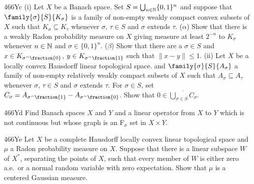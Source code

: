{\spheader 466Yc
(i) Let $X$ be a Banach space.   Set $S=\bigcup_{n\in\Bbb N}\{0,1\}^n$ and
suppose that $\family{\sigma}{S}{K_{\sigma}}$ is a family of
non-empty weakly compact
convex subsets of $X$ such that $K_{\sigma}\subseteq K_{\tau}$ whenever
$\sigma$, $\tau\in S$ and $\sigma$ extends $\tau$.   ($\alpha$) Show that
there is a weakly Radon
probability measure on $X$ giving measure at least $2^{-n}$ to $K_{\sigma}$
whenever $n\in\Bbb N$ and $\sigma\in\{0,1\}^n$.   ($\beta$) Show that
there are a $\sigma\in S$ and $x\in K_{\sigma^{\smallfrown}\fraction{0}}$,
$y\in K_{\sigma^{\smallfrown}\fraction{1}}$ such that $\|x-y\|\le 1$.
(ii) Let $X$ be a locally convex Hausdorff linear topological space.
and $\family{\sigma}{S}{A_{\sigma}}$ a family of
non-empty relatively weakly
compact subsets of $X$ such that $A_{\sigma}\subseteq A_{\tau}$ whenever
$\sigma$, $\tau\in S$ and $\sigma$ extends $\tau$.   For $\sigma\in S$, set
$C_{\sigma}=A_{\sigma^{\smallfrown}\fraction{1}}
  -A_{\sigma^{\smallfrown}\fraction{0}}$.   Show that
$0\in\overline{\bigcup_{\sigma\in S}C_{\sigma}}$.

\spheader 466Yd Find Banach spaces $X$ and $Y$ and a linear operator
from $X$ to $Y$ which is not continuous but whose graph is an
F$_{\sigma}$ set in $X\times Y$.

\spheader 466Ye
Let $X$ be a complete Hausdorff locally convex linear topological
space and $\mu$ a Radon probability measure on $X$.   Suppose that there is
a linear subspace $W$ of $X^*$, separating the points of $X$, such that
every member of $W$ is either zero a.e.\ or a normal random variable with
zero expectation.   Show that $\mu$ is a centered Gaussian measure.


}%


